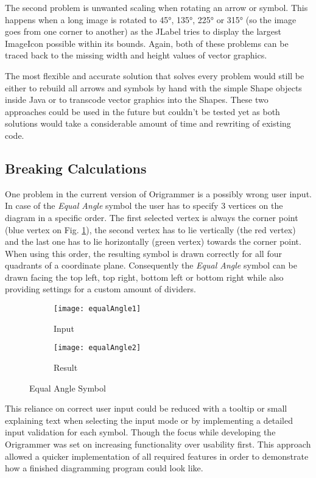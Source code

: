 The second problem is unwanted scaling when rotating an arrow or symbol. This happens when a long image is rotated to 45°, 135°, 225° or 315° (so the image goes from one corner to another) as the JLabel tries to display the largest ImageIcon possible within its bounds. Again, both of these problems can be traced back to the missing width and height values of vector graphics.

The most flexible and accurate solution that solves every problem would still be either to rebuild all arrows and symbols by hand with the simple Shape objects inside Java or to transcode vector graphics into the Shapes. These two approaches could be used in the future but couldn't be tested yet as both solutions would take a considerable amount of time and rewriting of existing code.

\subsection{Breaking Calculations}
\label{sec:breakingCalc}
One problem in the current version of Origrammer is a possibly wrong user input. In case of the \emph{Equal Angle} symbol the user has to specify 3 vertices on the diagram in a specific order. The first selected vertex is always the corner point (blue vertex on Fig. \ref{fig:equalAngle1}), the second vertex has to lie vertically (the red vertex) and the last one has to lie horizontally (green vertex) towards the corner point. When using this order, the resulting symbol is drawn correctly for all four quadrants of a coordinate plane. Consequently the \emph{Equal Angle} symbol can be drawn facing the top left, top right, bottom left or bottom right while also providing settings for a custom amount of dividers.
\begin{figure*}[htbp]
    \centering
    \begin{subfigure}{0.4\textwidth}
        \texttt{[image: equalAngle1]}
        \caption{Input}
        \label{fig:equalAngle1}
    \end{subfigure}
    \begin{subfigure}{0.4\textwidth}
        \texttt{[image: equalAngle2]}
        \caption{Result}
        \label{fig:equalAngle2}
    \end{subfigure}
    \caption{Equal Angle Symbol}
    \label{fig:equalAngleSymbol}
\end{figure*}

This reliance on correct user input could be reduced with a tooltip or small explaining text when selecting the input mode or by implementing a detailed input validation for each symbol. Though the focus while developing the Origrammer was set on increasing functionality over usability first. This approach allowed a quicker implementation of all required features in order to demonstrate how a finished diagramming program could look like.


